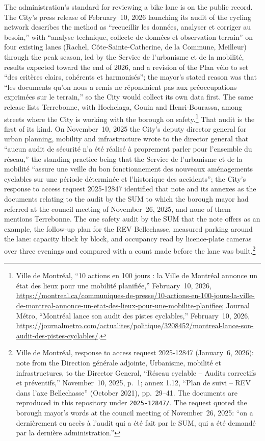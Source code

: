 \documentclass[11pt,letterpaper]{article}
\begin{document}
The administration's standard for reviewing a bike lane is on the public
record. The City's press release of February~10, 2026 launching its audit of
the cycling network describes the method as ``recueillir les donn\'ees,
analyser et corriger au besoin,'' with ``analyse technique, collecte de
donn\'ees et observation terrain'' on four existing lanes (Rachel,
C\^ote-Sainte-Catherine, de la Commune, Meilleur) through the peak season,
led by the Service de l'urbanisme et de la mobilit\'e, results expected
toward the end of 2026, and a revision of the Plan v\'elo to set ``des
crit\`eres clairs, coh\'erents et harmonis\'es''; the mayor's stated reason
was that ``les documents qu'on nous a remis ne r\'epondaient pas aux
pr\'eoccupations exprim\'ees sur le terrain,'' so the City would collect its
own data first. The same release lists Terrebonne, with Hochelaga, Gouin and
Henri-Bourassa, among streets where the City is working with the borough on
safety.\footnote{Ville de Montr\'eal, ``10 actions en 100 jours : la Ville de
Montr\'eal annonce un \'etat des lieux pour une mobilit\'e planifi\'ee,''
February~10, 2026,
\url{https://montreal.ca/communiques-de-presse/10-actions-en-100-jours-la-ville-de-montreal-annonce-un-etat-des-lieux-pour-une-mobilite-planifiee};
Journal M\'etro, ``Montr\'eal lance son audit des pistes cyclables,''
February~10, 2026,
\url{https://journalmetro.com/actualites/politique/3208452/montreal-lance-son-audit-des-pistes-cyclables/}.}
That audit is the first of its kind. On November~10, 2025 the City's deputy
director general for urban planning, mobility and infrastructure wrote to
the director general that ``aucun audit de s\'ecurit\'e n'a \'et\'e r\'ealis\'e
\`a proprement parler pour l'ensemble du r\'eseau,'' the standing practice
being that the Service de l'urbanisme et de la mobilit\'e ``assure une
veille du bon fonctionnement des nouveaux am\'enagements cyclables sur une
p\'eriode d\'etermin\'ee et l'historique des accidents''; the City's response
to access request 2025-12847 identified that note and its annexes as the
documents relating to the audit by the SUM to which the borough mayor had
referred at the council meeting of November~26, 2025, and none of them
mentions Terrebonne. The one safety audit by the SUM that the note offers
as an example, the follow-up plan for the REV Bellechasse, measured
parking around the lane: capacity block by block, and occupancy read by
licence-plate cameras over three evenings and compared with a count made
before the lane was built.\footnote{Ville de Montr\'eal, response to
access request 2025-12847 (January~6, 2026): note from the Direction
g\'en\'erale adjointe, Urbanisme, mobilit\'e et infrastructures, to the
Director General, ``R\'eseau cyclable -- Audits correctifs et
pr\'eventifs,'' November~10, 2025, p.~1; annex 1.12, ``Plan de suivi --
REV dans l'axe Bellechasse'' (October 2021), pp.~29--41. The documents are
reproduced in this repository under \texttt{2025-12847/}. The request
quoted the borough mayor's words at the council meeting of November~26,
2025: ``on a derni\`erement eu acc\`es \`a l'audit qui a \'et\'e fait par le
SUM, qui a \'et\'e demand\'e par la derni\`ere administration.''}
\end{document}
